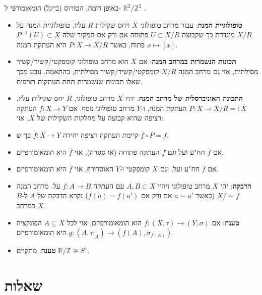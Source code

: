 \documentclass{tstextbook}
\begin{document}
\begin{remark}
באופן דומה, הטורוס (בייגל) הומאומורפי ל- \(\mathbb{R}^{2}/\mathbb{Z}^{2}\) .

\end{remark}
\begin{summary}
  \begin{itemize}
    \item \textbf{טופולוגיית המנה}: עבור מרחב טופולוגי \(X\) ויחס שקילות \(R\) עליו, טופולוגיית המנה על \(X/R\) מוגדרת כך שקבוצה \(U\subset X/R\) פתוחה אם ורק אם המקור שלה \(P^{-1}(U)\subset X\) פתוח, כאשר \(P:X\rightarrow X/R\) היא העתקת המנה \(x\mapsto[x]\).
    \item \textbf{תכונות הנשמרות במרחב המנה}: אם \(X\) הוא מרחב טופולוגי קומפקטי/קשיר/קשיר מסילתית, אזי גם מרחב המנה \(X/R\) קומפקטי/קשיר/קשיר מסילתית, בהתאמה. נובע מכך שאלו תכונות שנשמרות תחת העתקות רציפות.
    \item \textbf{התכונה האוניברסלית של מרחב המנה}: יהיו \(X\) מרחב טופולוגי, \(R\) יחס שקילות עליו, \(P:X\rightarrow X/R=:\overline{X}\) העתקת המנה, ו-\(Y\) מרחב טופולוגי נוסף. אם \(f:X\rightarrow Y\) העתקה רציפה שהיא קבועה על מחלקות השקילות של \(X\), אזי:


    \item קיימת העתקה רציפה יחידה \(\overline{f}:\overline{X}\rightarrow Y\) כך ש-\(\overline{f}\circ P=f\). 


    \item אם \(\overline{f}\) חח"ע ועל וגם \(f\) העתקה פתוחה (או סגורה), אזי \(\overline{f}\) היא הומאומורפיזם. 


    \item אם \(\overline{f}\) חח"ע ועל, וגם \(X\) קומפקטי ו-\(Y\) האוסדורף, אזי \(\overline{f}\) היא הומאומורפיזם. 


    \item \textbf{הדבקה}: יהי \(X\) מרחב טופולוגי ויהיו \(A,B\subset X\) עם העתקה \(f:A\rightarrow B\) על. מרחב המנה \(X/\sim f\) (כאשר \(a\sim a'\) אם ורק אם \(f(a)=f(a')\)) נקרא הדבקה של \(A\) ל-\(B\) במרחב \(X\).
    \item \textbf{טענה}: אם \(f:(X,\tau)\to (Y,\sigma)\) הוא הומאומורפיזם, אזי לכל \(A\subseteq X\) הפונקציה \(g:(A,\tau|_{A})\to(f(A),\sigma_{f(A)})\) היא הומאומורפיזם.
    \item \textbf{טענה}: מתקיים \(\mathbb{R}/\mathbb{Z}\cong S^{1}\).
  \end{itemize}
\end{summary}
\section{שאלות}
\end{document}
